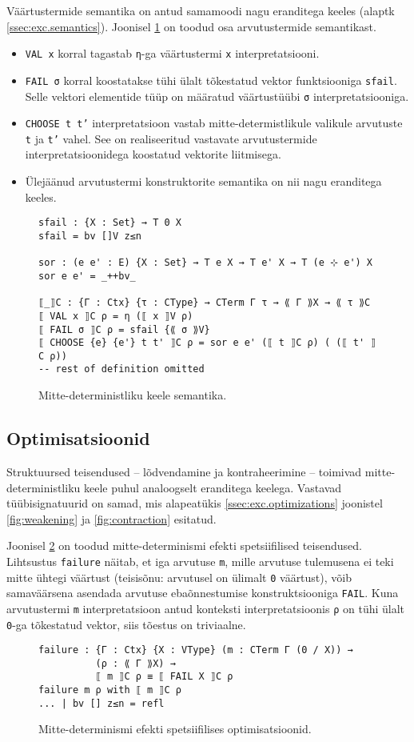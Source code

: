 \documentclass[a4paper,12pt]{article}
\begin{document}
Väärtustermide semantika on antud samamoodi nagu eranditega keeles (alaptk \ref{ssec:exc.semantics}).
Joonisel \ref{fig:nd.semantics} on toodud osa arvutustermide semantikast.
\begin{itemize}
\item {\tt VAL x} korral tagastab {\tt η}-ga väärtustermi {\tt x} interpretatsiooni.
\item {\tt FAIL σ} korral koostatakse tühi ülalt tõkestatud vektor funktsiooniga {\tt sfail}. Selle vektori elementide tüüp on määratud väärtustüübi {\tt σ} interpretatsiooniga.
\item {\tt CHOOSE t t'} interpretatsioon vastab mitte-determistlikule valikule arvutuste {\tt t} ja {\tt t'} vahel. See on realiseeritud vastavate arvutustermide interpretatsioonidega koostatud vektorite liitmisega.
\item Ülejäänud arvutustermi konstruktorite semantika on nii nagu eranditega keeles.
\end{itemize}
\begin{figure}
  \begin{BVerbatim}
sfail : {X : Set} → T 0 X
sfail = bv []V z≤n

sor : (e e' : E) {X : Set} → T e X → T e' X → T (e ⊹ e') X
sor e e' = _++bv_

⟦_⟧C : {Γ : Ctx} {τ : CType} → CTerm Γ τ → ⟪ Γ ⟫X → ⟪ τ ⟫C
⟦ VAL x ⟧C ρ = η (⟦ x ⟧V ρ)
⟦ FAIL σ ⟧C ρ = sfail {⟪ σ ⟫V}
⟦ CHOOSE {e} {e'} t t' ⟧C ρ = sor e e' (⟦ t ⟧C ρ) ( (⟦ t' ⟧C ρ))
-- rest of definition omitted
  \end{BVerbatim}
  \caption{Mitte-deterministliku keele semantika.}
  \label{fig:nd.semantics}
\end{figure}

\subsection{Optimisatsioonid}

Struktuursed teisendused -- lõdvendamine ja kontraheerimine -- toimivad mitte-deterministliku keele puhul analoogselt eranditega keelega. Vastavad tüübisignatuurid on samad, mis alapeatükis \ref{ssec:exc.optimizations} joonistel \ref{fig:weakening} ja \ref{fig:contraction} esitatud.

Joonisel \ref{fig:nd.opt1} on toodud mitte-determinismi efekti spetsiifilised teisendused. Lihtsustus {\tt failure} näitab, et iga arvutuse {\tt m}, mille arvutuse tulemusena ei teki mitte ühtegi väärtust (teisisõnu: arvutusel on ülimalt {\tt 0} väärtust), võib samaväärsena asendada arvutuse ebaõnnestumise konstruktsiooniga {\tt FAIL}. Kuna arvutustermi {\tt m} interpretatsioon antud konteksti interpretatsioonis {\tt ρ} on tühi ülalt {\tt 0}-ga tõkestatud vektor, siis tõestus on triviaalne.
\begin{figure}
  \begin{BVerbatim}
failure : {Γ : Ctx} {X : VType} (m : CTerm Γ (0 / X)) →
          (ρ : ⟪ Γ ⟫X) → 
          ⟦ m ⟧C ρ ≡ ⟦ FAIL X ⟧C ρ
failure m ρ with ⟦ m ⟧C ρ
... | bv [] z≤n = refl
  \end{BVerbatim}
  \caption{Mitte-determinismi efekti spetsiifilises optimisatsioonid.}
  \label{fig:nd.opt1}
\end{figure}
\end{document}
